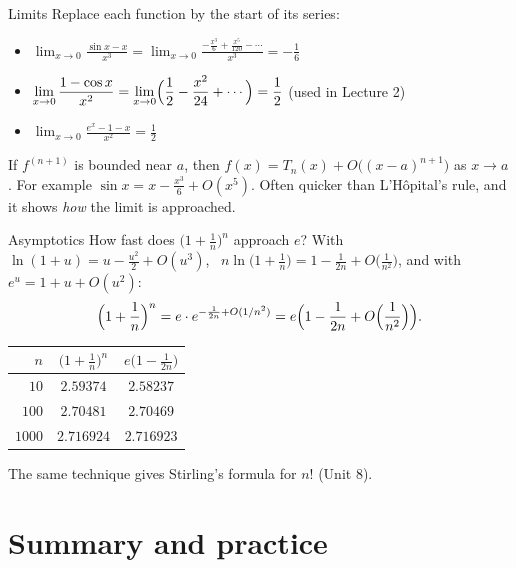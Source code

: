 \documentclass{wosm-slides}
\begin{document}
\begin{frame}{Limits}
  Replace each function by the start of its series:
  \begin{itemize}
    \item $\displaystyle\lim_{x\to0} \frac{\sin x - x}{x^3}
      = \lim_{x\to0} \frac{-\frac{x^3}{6} + \frac{x^5}{120} - \cdots}{x^3} = -\frac16$
    \item $\displaystyle\lim_{x\to0} \frac{1 - \cos x}{x^2}
      = \lim_{x\to0} \Bigl(\frac12 - \frac{x^2}{24} + \cdots\Bigr) = \frac12$
      \quad (used in Lecture 2)
    \item $\displaystyle\lim_{x\to0} \frac{e^x - 1 - x}{x^2} = \frac12$
  \end{itemize}
  \pause
  \begin{remark}[$O$-notation]
    If $f^{(n+1)}$ is bounded near $a$, then $f(x) = T_n(x) + O\bigl((x-a)^{n+1}\bigr)$ as
    $x \to a$. For example $\sin x = x - \frac{x^3}{6} + O(x^5)$.
    Often quicker than L'H\^opital's rule, and it shows \emph{how} the limit is approached.
  \end{remark}
\end{frame}

\begin{frame}{Asymptotics}
  How fast does $\bigl(1 + \frac1n\bigr)^n$ approach $e$? With $\ln(1 + u) = u - \frac{u^2}{2} + O(u^3)$,
  \ $n \ln\bigl(1 + \frac1n\bigr) = 1 - \frac{1}{2n} + O\bigl(\frac{1}{n^2}\bigr)$, and with
  $e^u = 1 + u + O(u^2)$:
  \[ \Bigl(1 + \frac1n\Bigr)^n = e \cdot e^{-\frac{1}{2n} + O(1/n^2)}
     = e \Bigl(1 - \frac{1}{2n} + O\Bigl(\frac{1}{n^2}\Bigr)\Bigr) . \]
  \pause
  \begin{center}
  \small
  \begin{tabular}{rcc}
    \toprule
    $n$ & $\bigl(1 + \frac1n\bigr)^n$ & $e \bigl(1 - \frac{1}{2n}\bigr)$ \\
    \midrule
    $10$   & $2.59374$  & $2.58237$ \\
    $100$  & $2.70481$  & $2.70469$ \\
    $1000$ & $2.716924$ & $2.716923$ \\
    \bottomrule
  \end{tabular}
  \end{center}
  {\small The same technique gives Stirling's formula for $n!$ (Unit 8).\par}
\end{frame}

\section{Summary and practice}
\end{document}
